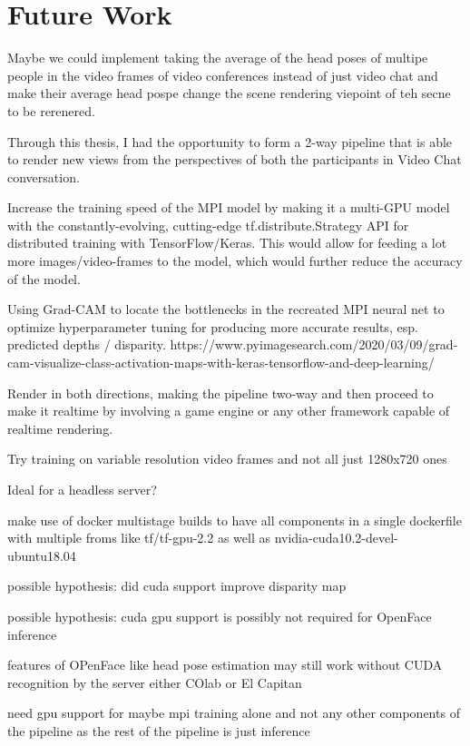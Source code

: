 \section{Future Work}\label{sec:future-work}

Maybe we could implement taking the average of the head poses of multipe people in the video frames of video conferences instead of just video chat and make their average head pospe change the scene rendering viepoint of teh secne to be rerenered.

Through this thesis, I had the opportunity to form a 2-way pipeline that is able to render new views from the perspectives of both the participants in Video Chat conversation.

Increase the training speed of the MPI model by making it a multi-GPU model with the constantly-evolving, cutting-edge tf.distribute.Strategy API for distributed training with TensorFlow/Keras.
This would allow for feeding a lot more images/video-frames to the model, which would further reduce the accuracy of the model.

Using Grad-CAM to locate the bottlenecks in the recreated MPI neural net to optimize hyperparameter tuning for producing more accurate results, esp. predicted depths / disparity.
https://www.pyimagesearch.com/2020/03/09/grad-cam-visualize-class-activation-maps-with-keras-tensorflow-and-deep-learning/


Render in both directions, making the pipeline two-way and then proceed to make it realtime by involving a game engine or any other framework capable of realtime rendering. 

Try training on variable resolution video frames and not all just 1280x720 ones

Ideal for a headless server?

make use of docker multistage builds to have all components in a single dockerfile
with multiple froms like tf/tf-gpu-2.2 as well as nvidia-cuda10.2-devel-ubuntu18.04

possible hypothesis: did cuda support improve disparity map

possible hypothesis: cuda gpu support is possibly not required for OpenFace inference

features of OPenFace like head pose estimation may still work without CUDA recognition by the server either COlab or El Capitan 

need gpu support for maybe mpi training alone and not any other components of the pipeline as the rest of the pipeline is just inference

